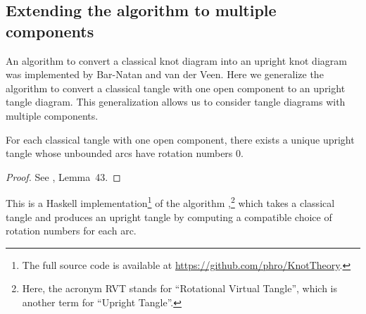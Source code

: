 \subsection{Extending the algorithm to multiple components}

An algorithm to convert a classical knot diagram into an upright knot diagram
was implemented by Bar-Natan and van der Veen. Here we generalize the algorithm
to convert a classical tangle with one open component to an upright tangle
diagram. This generalization allows us to consider tangle diagrams with multiple
components.

\begin{lemma}
        For each classical tangle with one open component, there exists a unique
        upright tangle whose unbounded arcs have rotation numbers $0$.
\end{lemma}
\begin{proof}
        See \cite{BV}, Lemma~43.
\end{proof}

This is a Haskell implementation\footnote{The full source code is available at
\url{https://github.com/phro/KnotTheory}.} of the algorithm ,\footnote{Here, the
acronym RVT stands for \enquote{Rotational Virtual Tangle}, which is
another term for \enquote{Upright Tangle}.} which takes a classical tangle and
produces an upright tangle by computing a compatible choice of rotation numbers
for each arc.



